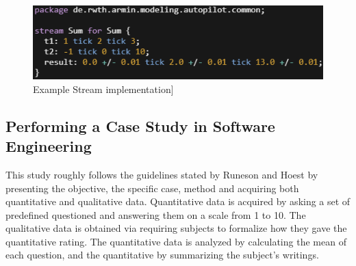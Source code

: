 \begin{figure}[!h]
	\centering
	\includegraphics[scale=0.75]{pictures/EMAStream.PNG}
	\caption{Example Stream implementation]}
	\label{fig:EMAStream}
\end{figure}



\subsection{Performing a Case Study in Software Engineering}
This study roughly follows the guidelines stated by Runeson and Hoest \cite{CaseStudyGuidelines} by presenting the objective, the specific case, method and acquiring both quantitative and qualitative data. Quantitative data is acquired by asking a set of predefined questioned and answering them on a scale from 1 to 10. The qualitative data is obtained via requiring subjects to formalize how they gave the quantitative rating.
The quantitative data is analyzed by calculating the mean of each question, and the quantitative by summarizing the subject's writings.
